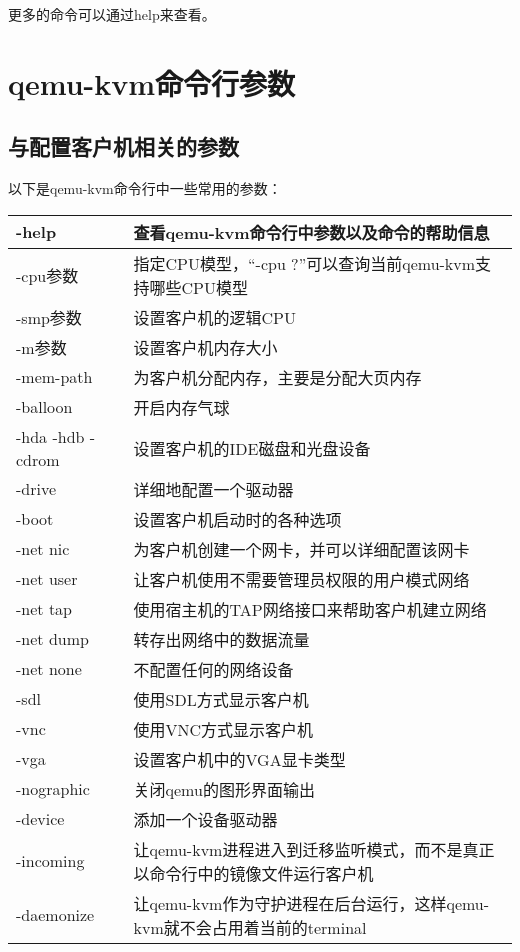 \documentclass[a4paper,left=2.5cm,right=2.5cm,11pt]{article}
\newcommand{\interval}{\vspace{0.5em}}
\begin{document}
	更多的命令可以通过help来查看。

\clearpage

\section{qemu-kvm命令行参数}
\subsection{与配置客户机相关的参数}
	以下是qemu-kvm命令行中一些常用的参数：
	\interval
	\begin{longtable}{p{3cm}p{10cm}}
	\hline
	-help & 查看qemu-kvm命令行中参数以及命令的帮助信息 \\
	\hline
	-cpu参数 & 指定CPU模型，“-cpu ?”可以查询当前qemu-kvm支持哪些CPU模型 \\
	\hline
	-smp参数 & 设置客户机的逻辑CPU \\
	\hline
	-m参数 & 设置客户机内存大小 \\
	\hline
	-mem-path & 为客户机分配内存，主要是分配大页内存 \\
	\hline
	-balloon & 开启内存气球 \\
	\hline
	-hda -hdb -cdrom & 设置客户机的IDE磁盘和光盘设备 \\
	\hline
	-drive & 详细地配置一个驱动器 \\
	\hline
	-boot & 设置客户机启动时的各种选项 \\
	\hline
	-net nic & 为客户机创建一个网卡，并可以详细配置该网卡 \\
	\hline
	-net user & 让客户机使用不需要管理员权限的用户模式网络 \\
	\hline
	-net tap & 使用宿主机的TAP网络接口来帮助客户机建立网络 \\
	\hline
	-net dump & 转存出网络中的数据流量 \\
	\hline
	-net none & 不配置任何的网络设备 \\
	\hline
	-sdl & 使用SDL方式显示客户机 \\
	\hline
	-vnc & 使用VNC方式显示客户机 \\
	\hline
	-vga & 设置客户机中的VGA显卡类型 \\
	\hline
	-nographic & 关闭qemu的图形界面输出 \\
	\hline
	-device & 添加一个设备驱动器 \\
	\hline
	-incoming & 让qemu-kvm进程进入到迁移监听模式，而不是真正以命令行中的镜像文件运行客户机 \\
	\hline
	-daemonize & 让qemu-kvm作为守护进程在后台运行，这样qemu-kvm就不会占用着当前的terminal \\

\end{longtable}
\end{document}
